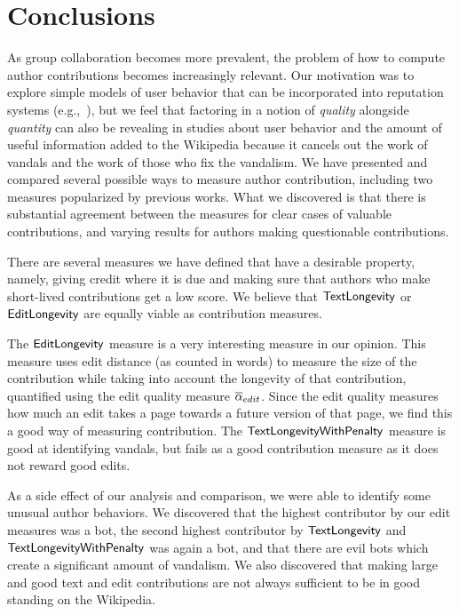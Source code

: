 \section{Conclusions}

As group collaboration becomes more prevalent,
the problem of how to compute author contributions
becomes increasingly relevant.
Our motivation was to explore simple models of user behavior
that can be incorporated into reputation
systems (e.g.,~\cite{Adler2007}),
but we feel that factoring in a notion
of \textit{quality} alongside \textit{quantity}
can also be revealing in studies about
user behavior and the amount of useful information
added to the Wikipedia because it cancels out
the work of vandals and the work of those who
fix the vandalism.
We have presented and compared several possible ways to
measure author contribution, including
two measures popularized by previous works.
What we discovered is that there is substantial
agreement between the measures for clear
cases of valuable contributions, and
varying results for authors making
questionable contributions.

There are several measures we have defined that
have a desirable property, namely, giving credit
where it is due and making sure that authors who make short-lived 
contributions get a low score.
We believe that $\mathsf{TextLongevity}$ or $\mathsf{EditLongevity}$ are
equally viable as contribution measures.

The $\mathsf{EditLongevity}$ measure is a very interesting measure
in our opinion.
This measure uses edit distance (as counted in words)
to measure the size of the contribution while taking into
account the longevity of that contribution, quantified
using the edit quality measure ${\overline{\alpha}}_{edit}$.
Since the edit quality measures how much an edit takes a 
page towards a future version of that page, we find this
a good way of measuring contribution.
The $\mathsf{TextLongevityWithPenalty}$ measure is good at identifying vandals,
but fails as a good contribution measure as it does not
reward good edits.

As a side effect of our analysis and comparison, we were
able to identify some unusual author behaviors.
We discovered that the highest contributor by our edit 
measures was a bot, the second highest contributor by 
$\mathsf{TextLongevity}$ and $\mathsf{TextLongevityWithPenalty}$ was again a bot, and that there 
are evil bots which create a significant amount of vandalism.
We also discovered that making large and good text and edit
contributions are not always sufficient to be in good 
standing on the Wikipedia.


